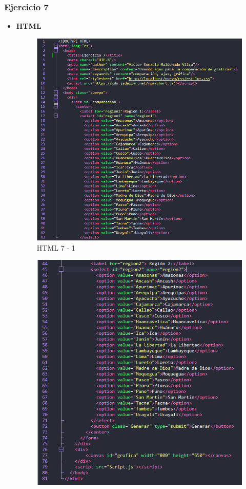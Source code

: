 \documentclass{article}
\begin{document}
	\subsubsection{Ejercicio 7}
	\begin{itemize}
		\item \textbf{HTML}
		\begin{figure}[H]
			\centering
			\includegraphics[width=1\textwidth,keepaspectratio]{img/html7-1.png}
			\caption{HTML 7 - 1}
		\end{figure}
		\begin{figure}[H]
			\centering
			\includegraphics[width=1\textwidth,keepaspectratio]{img/html7-2.png}

\end{figure}
\end{itemize}
\end{document}
